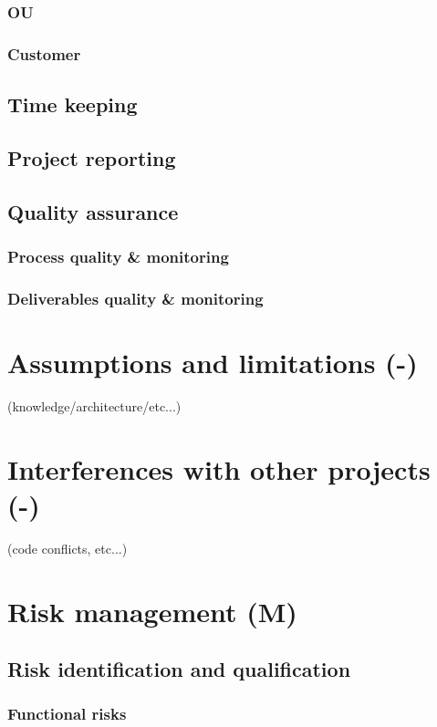 \documentclass[a4paper,12pt,abstracton,titlepage]{scrartcl}
\begin{document}
\subsubsection{OU}
\subsubsection{Customer}
\subsection{Time keeping}
\subsection{Project reporting}
\subsection{Quality assurance}
\subsubsection{Process quality \& monitoring}
\subsubsection{Deliverables quality \& monitoring}

\section{Assumptions and limitations (-)}
\label{sec:assumptions-limitations}
(knowledge/architecture/etc...)

\section{Interferences with other projects (-)}
\label{sec:interferences}
(code conflicts, etc...)

\section{Risk management (M)}
\label{sec:risk-management}
\subsection{Risk identification and qualification}
\subsubsection{Functional risks}
\end{document}
